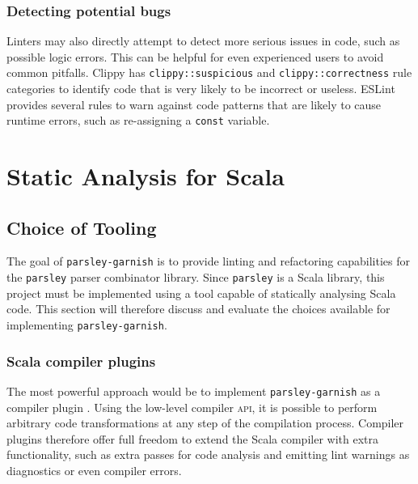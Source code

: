 \subsubsection{Detecting potential bugs}
Linters may also directly attempt to detect more serious issues in code, such as possible logic errors.
This can be helpful for even experienced users to avoid common pitfalls.
Clippy has \texttt{clippy::suspicious} and \texttt{clippy::correctness} rule categories to identify code that is very likely to be incorrect or useless.
ESLint provides several rules to warn against code patterns that are likely to cause runtime errors, such as re-assigning a \texttt{const} variable.

\section{Static Analysis for Scala}
\subsection{Choice of Tooling}
The goal of \texttt{parsley-garnish} is to provide linting and refactoring capabilities for the \texttt{parsley} parser combinator library.
Since \texttt{parsley} is a Scala library, this project must be implemented using a tool capable of statically analysing Scala code.
This section will therefore discuss and evaluate the choices available for implementing \texttt{parsley-garnish}.

\subsubsection{Scala compiler plugins}
The most powerful approach would be to implement \texttt{parsley-garnish} as a compiler plugin .
Using the low-level compiler \textsc{api}, it is possible to perform arbitrary code transformations at any step of the compilation process.
Compiler plugins therefore offer full freedom to extend the Scala compiler with extra functionality, such as extra passes for code analysis and emitting lint warnings as diagnostics or even compiler errors.

